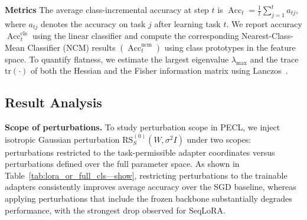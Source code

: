 \documentclass{article}
\theoremstyle{plain}
\theoremstyle{definition}
\theoremstyle{remark}
\begin{document}
\noindent\textbf{Metrics}\quad
The average class-incremental accuracy at step $t$ is
$
\operatorname{Acc}_t = \frac{1}{t} \sum_{j=1}^{t} a_{tj}
$,  where $a_{tj}$ denotes the accuracy on task $j$ after learning task $t$. 
We report accuracy $\operatorname{Acc}_t^{\mathrm{cls}}$ using the linear classifier and
compute the corresponding Nearest-Class-Mean Classifier (NCM) results
$(\operatorname{Acc}_t^{\mathrm{ncm}})$ using class prototypes in the feature space.
To quantify flatness, we estimate the largest eigenvalue $\lambda_{\max}$ and the trace $\mathrm{tr}(\cdot)$ of both the Hessian and the Fisher information matrix using Lanczos~\cite{ghorbaniInvestigationNeuralNet2019}.

\subsection{Result Analysis}





\noindent\textbf{Scope of perturbations.}\quad
To study perturbation scope in PECL, we inject isotropic Gaussian perturbation $\mathrm{RS}_S^{(0)}({W}, \sigma^2 
I)$ under two scopes: perturbations restricted to the task-permissible adapter coordinates versus perturbations defined over the full parameter space.
As shown in Table~\ref{tab:lora_or_full_cls—show}, restricting perturbations to the trainable adapters consistently improves average accuracy over the SGD baseline, whereas applying perturbations that include the frozen backbone substantially degrades performance, with the strongest drop observed for SeqLoRA.
\end{document}
